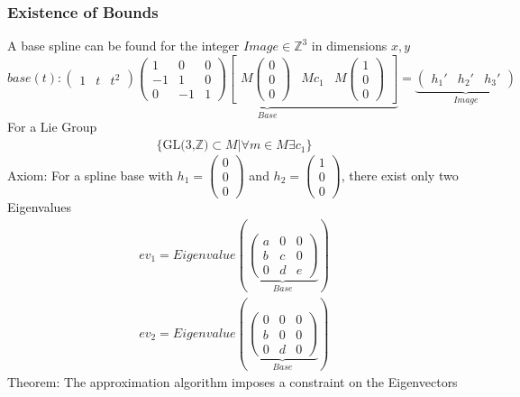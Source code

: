 \documentclass[a4paper,landscape]{report}
\begin{document}
\subsubsection{Existence of Bounds}
A base spline can be found for the integer $Image \in \mathbb{Z}^3$ in dimensions $x,y$
\begin{equation}
base(t):
\begin{pmatrix}
1 & t & t^2
\end{pmatrix}
\underbrace{\begin{pmatrix}
1 & 0 & 0\\
-1 & 1 & 0\\
0 & -1 & 1
\end{pmatrix}\begin{bmatrix}
M\begin{pmatrix}0 \\ 0 \\ 0\end{pmatrix} & Mc_{1} & M \begin{pmatrix}1 \\ 0 \\ 0\end{pmatrix}
\end{bmatrix}}_{Base}
=
\underbrace{
\begin{pmatrix}
h_{1}' & h_{2}' & h_{3}'
\end{pmatrix}}_{Image}
\end{equation}
For a Lie Group
\begin{align}
\text{\{GL(3,$\mathbb{Z}$)} \subset M \vert \forall m \in M \exists c_{1}\}
\end{align}
Axiom: For a spline base with $h_{1}=\begin{pmatrix}0 \\ 0 \\ 0\end{pmatrix}$ and $h_{2}=\begin{pmatrix}1 \\ 0 \\ 0\end{pmatrix}$, there exist only two Eigenvalues ~\cite["Spline\_Eigensystems.nb"]{Stopeight}
\begin{align}
ev_{1}=Eigenvalue(
\underbrace{\begin{pmatrix}
a & 0 & 0\\
b & c & 0\\
0 & d & e
\end{pmatrix}}_{Base})\\
ev_{2}=Eigenvalue(
\underbrace{\begin{pmatrix}
0 & 0 & 0\\
b & 0 & 0\\
0 & d & 0
\end{pmatrix}}_{Base})
\end{align}
Theorem: The approximation algorithm imposes a constraint on the Eigenvectors ~\cite["Spline\_EVConstraint.nb"]{Stopeight}
\end{document}
